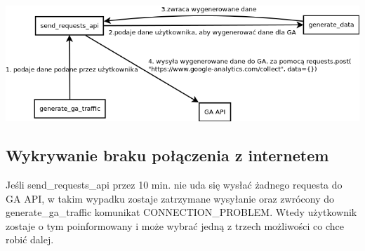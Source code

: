 \documentclass{article}
\begin{document}
\includegraphics[scale=0.5]{connection_ga}

\subsection{Wykrywanie braku połączenia z internetem}
Jeśli send\_requests\_api przez 10 min. nie uda się wysłać żadnego requesta do GA API, w takim wypadku zostaje zatrzymane wysyłanie oraz zwrócony do generate\_ga\_traffic komunikat CONNECTION\_PROBLEM. Wtedy użytkownik zostaje o tym poinformowany i może wybrać jedną z trzech możliwości co chce robić dalej.
\end{document}
